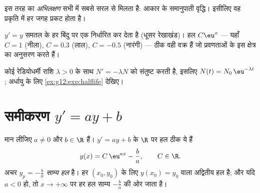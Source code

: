 \begin{remark}
इस तरह  का \emph{अभिलक्षण} सभी  में सबसे सरल
 से मिलता है: आकार के समानुपाती वृद्धि। इसीलिए वह प्रकृति में हर जगह
प्रकट होता है।
\end{remark}

\begin{omfigure}

{\small {} $y' = y$ समतल के हर बिंदु पर एक  निर्धारित कर देता है
(धूसर रेखाखंड)। हल $C\eu^{x}$ --- यहाँ $C = 1$ (नीला), $C = 0.3$ (लाल), $C = -0.5$ (नारंगी) ---
ठीक वही वक्र हैं जो प्रवणताओं के इस क्षेत्र का अनुसरण करते हैं।}
\end{omfigure}

\begin{example}[रेडियोधर्मी क्षय]\label{ex:g12:diffeq:decay}
कोई रेडियोधर्मी राशि $\lambda > 0$ के साथ $N' = -\lambda N$ को संतुष्ट करती है, इसलिए $N(t) = N_0\,\eu^{-\lambda t}$;
अर्धायु के लिए \cref{ex:g12:exp:halflife} देखिए।
\end{example}

\section{समीकरण \texorpdfstring{$y' = ay + b$}{y' = ay + b}}

\begin{theorem}[$y' = ay + b$ के हल]\label{thm:g12:diffeq:affine}
मान लीजिए $a \neq 0$ और $b \in \R$ हैं। $y' = ay + b$ के $\R$ पर हल ठीक ये  हैं
\[
y(x) = C\,\eu^{ax} - \frac{b}{a}, \qquad C \in \R .
\]
अचर  $y_p = -\frac ba$ \emph{साम्य हल} है। हर $(x_0, y_0)$ के लिए $y(x_0) = y_0$ वाला अद्वितीय हल है;
और यदि $a < 0$ हो, तो $x \to +\infty$ पर हर हल साम्य $-\frac ba$ की ओर जाता है।
\end{theorem}


